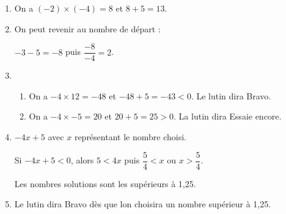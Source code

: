 
\medskip

%

\begin{enumerate}
\item %
On a $(- 2) \times (- 4) = 8$ et $8 + 5 = 13$.
\item %
On peut revenir au nombre de départ :

$- 3 - 5 = - 8$ puis $\dfrac{- 8}{- 4} = 2$.
\item %

%

	\begin{enumerate}
		\item %
		On a $- 4 \times 12 = - 48$ et $- 48 + 5 = - 43 < 0$. Le lutin dira Bravo. 
		\item %
		On a $ - 4 \times - 5 = 20$ et $20 + 5 = 25 >0$. La lutin dira Essaie encore.
 	\end{enumerate}
\item  %
$- 4x + 5$ avec $x$ représentant le nombre choisi.

Si $- 4x + 5 < 0$, alors $5 < 4x$ puis $\dfrac{5}{4} < x$ ou $x > \dfrac{5}{4}$.

Les nombres solutions sont les supérieurs à 1,25.
\item  %
Le lutin dira Bravo dès que lon choisira un nombre supérieur à 1,25.
\end{enumerate}

\bigskip

